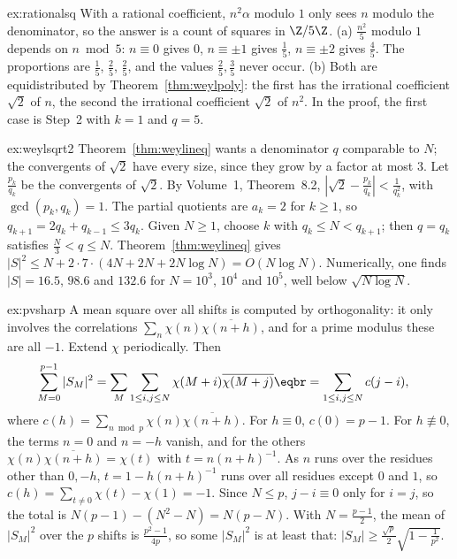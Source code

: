 \begin{solution}{ex:rationalsq}
\idea With a rational coefficient, $n^2\alpha$ modulo $1$ only sees $n$ modulo the denominator, so the answer is a count of squares in $\Z/5\Z$.
\writeup (a) $\frac{n^2}5$ modulo $1$ depends on $n\bmod5$: $n\equiv0$ gives $0$, $n\equiv\pm1$ gives $\frac15$, $n\equiv\pm2$ gives $\frac45$. The proportions are $\frac15$, $\frac25$, $\frac25$, and the values $\frac25,\frac35$ never occur.
(b) Both are equidistributed by Theorem~\ref{thm:weylpoly}: the first has the irrational coefficient $\sqrt2$ of $n$, the second the irrational coefficient $\sqrt2$ of $n^2$. In the proof, the first case is Step~2 with $k=1$ and $q=5$.
\end{solution}

\begin{solution}{ex:weylsqrt2}
\idea Theorem~\ref{thm:weylineq} wants a denominator $q$ comparable to $N$; the convergents of $\sqrt2$ have every size, since they grow by a factor at most $3$.
\writeup Let $\frac{p_k}{q_k}$ be the convergents of $\sqrt2$. By Volume~1, Theorem~8.2, $|\sqrt2-\frac{p_k}{q_k}|<\frac1{q_k^2}$, with $\gcd(p_k,q_k)=1$. The partial quotients are $a_k=2$ for $k\ge1$, so $q_{k+1}=2q_k+q_{k-1}\le3q_k$. Given $N\ge1$,
choose $k$ with $q_k\le N<q_{k+1}$; then $q=q_k$ satisfies $\frac N3<q\le N$. Theorem~\ref{thm:weylineq} gives $|S|^2\le N+2\cdot7\cdot(4N+2N+2N\log N)=O(N\log N)$. Numerically, one finds $|S|=16.5$, $98.6$ and $132.6$ for $N=10^3$, $10^4$ and $10^5$, well below $\sqrt{N\log N}$.
\end{solution}

\begin{solution}{ex:pvsharp}
\idea A mean square over all shifts is computed by orthogonality: it only involves the correlations $\sum_n\chi(n)\overline{\chi(n+h)}$, and for a prime modulus these are all $-1$.
\writeup Extend $\chi$ periodically. Then
\[
\begin{aligned}\sum_{M=0}^{p-1}|S_M|^2&=\sum_{M}\sum_{1\le i,j\le N}\chi(M+i)\overline{\chi(M+j)}\eqbr=\sum_{1\le i,j\le N}c(j-i),\end{aligned}
\]
where $c(h)=\sum_{n\bmod p}\chi(n)\overline{\chi(n+h)}$. For $h\equiv0$, $c(0)=p-1$. For $h\not\equiv0$, the terms $n=0$ and $n=-h$ vanish, and for the others $\chi(n)\overline{\chi(n+h)}=\chi(t)$ with $t=n(n+h)^{-1}$. As $n$ runs over
the residues other than $0,-h$, $t=1-h(n+h)^{-1}$ runs over all residues except $0$ and $1$, so $c(h)=\sum_{t\ne0}\chi(t)-\chi(1)=-1$. Since $N\le p$, $j-i\equiv0$ only for $i=j$, so the total is $N(p-1)-(N^2-N)=N(p-N)$.
With $N=\frac{p-1}2$, the mean of $|S_M|^2$ over the $p$ shifts is $\frac{p^2-1}{4p}$, so some $|S_M|^2$ is at least that: $|S_M|\ge\frac{\sqrt p}2\sqrt{1-\frac1{p^2}}$.
\end{solution}


